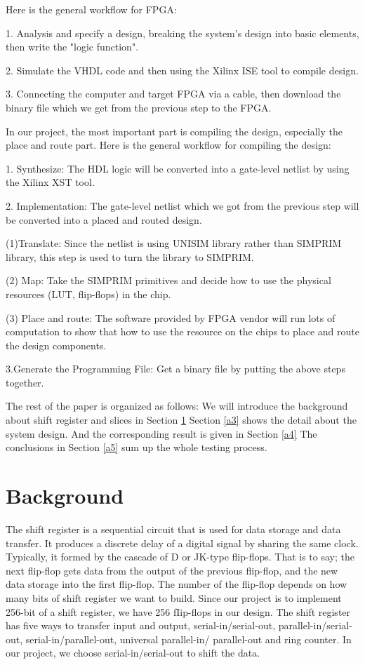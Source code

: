 \documentclass[12pt]{article}
\begin{document}
Here is the general workflow for FPGA:

1. Analysis and specify a design, breaking the system's design into basic elements, then write the "logic function".

2. Simulate the VHDL code and then using the Xilinx ISE tool to compile design.

3. Connecting the computer and target FPGA via a cable, then download the binary file which we get from the previous step to the FPGA.

In our project, the most important part is compiling the design, especially the place and route part. Here is the general workflow for compiling the design:

1. Synthesize: The HDL logic will be converted into a gate-level netlist by using the Xilinx XST tool.

2. Implementation: The gate-level netlist which we got from the previous step will be converted into a placed and routed design.

(1)Translate: Since the netlist is using UNISIM library rather than SIMPRIM library, this step is used to turn the library to SIMPRIM. 

(2) Map: Take the SIMPRIM primitives and decide how to use the physical resources (LUT, flip-flops) in the chip.

(3) Place and route: The software provided by FPGA vendor will run lots of computation to show that how to use the resource on the chips to place and route the design components.

3.Generate the Programming File: Get a binary file by putting the above steps together. 

The rest of the paper is organized as follows: We will introduce the background about shift register and slices in Section \ref{a2}  Section  \ref{a3} shows the detail about the system design. And the corresponding result is given in Section \ref{a4} The conclusions in Section \ref{a5} sum up the whole testing process. 

\section{Background}  \label{a2}
The shift register is a sequential circuit that is used for data storage and data transfer. It produces a discrete delay of a digital signal by sharing the same clock. Typically, it formed by the cascade of D or JK-type flip-flops. That is to say; the next flip-flop gets data from the output of the previous flip-flop, and the new data storage into the first flip-flop. The number of the flip-flop depends on how many bits of shift register we want to build. Since our project is to implement 256-bit of a shift register, we have 256 fIip-flops in our design. The shift register has five ways to transfer input and output, serial-in/serial-out, parallel-in/serial-out, serial-in/parallel-out, universal parallel-in/ parallel-out and ring counter. In our project, we choose serial-in/serial-out to shift the data.
\end{document}
